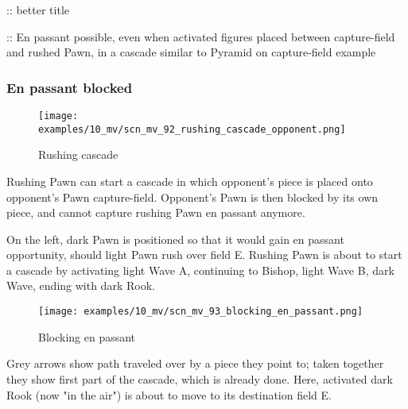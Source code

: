 \TODO :: better title

\TODO :: En passant possible, even when activated figures placed between capture-field and rushed Pawn, in a cascade similar to Pyramid on capture-field example

\clearpage %

\subsubsection*{En passant blocked}
\label{sec:Miranda's veil/Wave/En passant/En passant blocked}

\vspace*{-0.7\baselineskip}
\noindent
\begin{wrapfigure}[15]{l}{0.4\textwidth}
\centering
\texttt{[image: examples/10\_mv/scn\_mv\_92\_rushing\_cascade\_opponent.png]}
\vspace*{-1.4\baselineskip}
\caption{Rushing cascade}
\label{fig:scn_mv_92_rushing_cascade_opponent}
\end{wrapfigure}
Rushing Pawn can start a cascade in which opponent's piece is placed onto opponent's
Pawn capture-field.
Opponent's Pawn is then blocked by its own piece, and cannot capture rushing Pawn en
passant anymore.

On the left, dark Pawn is positioned so that it would gain en passant opportunity,
should light Pawn rush over field E. Rushing Pawn is about to start a cascade by
activating light Wave A, continuing to Bishop, light Wave B, dark Wave, ending
with dark Rook.


\noindent
\begin{wrapfigure}[7]{l}{0.4\textwidth}
\centering
\texttt{[image: examples/10\_mv/scn\_mv\_93\_blocking\_en\_passant.png]}
\vspace*{-1.4\baselineskip}
\caption{Blocking en passant}
\label{fig:scn_mv_93_blocking_en_passant}
\end{wrapfigure}
Grey arrows show path traveled over by a piece they point to; taken together they
show first part of the cascade, which is already done.\newline
\indent
Here, activated dark Rook (now "in the air") is about to move to its destination
field E.

